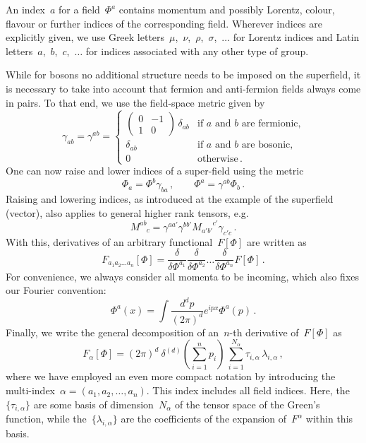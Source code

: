 \documentclass[10pt,prd,nofootinbib,superscriptaddress,twocolumn]{revtex4-2}
\begin{document}
An index~$a$ for a field~$\Phi^a$ contains momentum and possibly Lorentz, colour, flavour or further indices of the corresponding field.
Wherever indices are explicitly given, we use Greek letters~$\mu$,~$\nu$,~$\rho$,~$\sigma$,~$\dotsc$ for Lorentz indices and Latin letters~$a$,~$b$,~$c$,~$\dotsc$ for indices associated with any other type of group. 

While for bosons no additional structure needs to be imposed on the superfield, it is necessary to take into account that fermion and anti-fermion fields always come in pairs.
To that end, we use the field-space metric given by
%
\begin{equation}
	\gamma_{ab} = \gamma^{ab} = \begin{cases}
		\begin{pmatrix}
			0 & -1 \\
			1 & 0
		\end{pmatrix}\,\delta_{ab}
		& \text{if $a$ and $b$ are fermionic,} \\[3ex]
		\delta_{ab} & \text{if $a$ and $b$ are bosonic,}   \\[2ex]
		0               & \text{otherwise} 
		\,.
	\end{cases}
\end{equation}
%
One can now raise and lower indices of a super-field using the metric
%
\begin{equation}
	\Phi_a = \Phi^b\gamma_{ba} \,,
	\quad \quad
	\Phi^a = \gamma^{ab}\Phi_b \,.
\end{equation}
%
Raising and lowering indices, as introduced at the example of the superfield (vector), also applies to general higher rank tensors, e.g.
%
\begin{equation}
	M^{ab}_{\phantom{ab}c} = \gamma^{aa'} \gamma^{bb'} M_{a'b'}^{\phantom{a'b'}c'} \gamma_{c'c}
	\,.
\end{equation}
%
With this, derivatives of an arbitrary functional~$F[\Phi]$ are written as
%
\begin{equation}
	F_{a_1 a_2 \ldots a_n}[\Phi] =
	\frac{\delta}{\delta \Phi^{a_1}} \frac{\delta}{\delta \Phi^{a_2}} \ldots \frac{\delta}{\delta \Phi^{a_n}} F[\Phi]
	\,.
	\label{eq:Falpha}
\end{equation}
%
For convenience, we always consider all momenta to be incoming, which also fixes our Fourier convention:
%
\begin{equation}
	\Phi^a(x) = \int \frac{d^d p}{(2\pi)^d} e^{ipx}\Phi^a(p)
	\,.
\end{equation}
%	
Finally, we write the general decomposition of an~$n$-th derivative of~$F[\Phi]$ as
%
\begin{equation}\label{eq:general_decomposition}
	F_{\alpha}[\Phi] = (2\pi)^d\ \delta^{(d)}\left( \sum_{i=1}^n p_i \right)\,
	\sum_{i=1}^{N_\alpha} \tau_{i,\alpha} \, \lambda_{i,\alpha}
	\,,
\end{equation}
%
where we have employed an even more compact notation by introducing the multi-index~$\alpha = (a_1, a_2, \ldots, a_n)$. 
This index includes all field indices.
Here, the~$\{\tau_{i,\alpha}\}$ are some basis of dimension~$N_\alpha$ of the tensor space of the Green's function, while the~$\{\lambda_{i,\alpha}\}$ are the coefficients of the expansion of~$F^\alpha$ within this basis.
\end{document}
